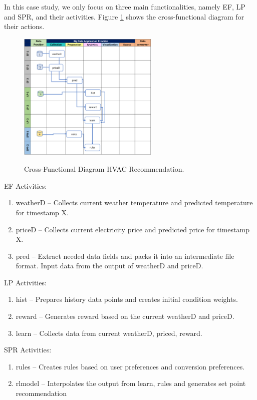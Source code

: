 In this case study, we only focus on three main functionalities, namely EF, LP and SPR, and their
activities. Figure \ref{fig:hvac-2} shows the cross-functional diagram for their actions.



\begin{figure}[htb]
\centering\includegraphics[width=0.6\textwidth]{usecase/hvac-2.png}
\label{fig:hvac-2}
\caption{Cross-Functional Diagram HVAC Recommendation.}
\end{figure}


EF Activities:

\begin{enumerate}
\item weatherD – Collects current weather temperature and predicted temperature for timestamp
X.
\item priceD – Collects current electricity price and predicted price for timestamp X.
\item pred – Extract needed data fields and packs it into an intermediate file format. Input data
from the output of weatherD and priceD.
\end{enumerate}


LP Activities:

\begin{enumerate}
\item hist – Prepares history data points and creates initial condition weights.
\item reward – Generates reward based on the current weatherD and priceD.
\item learn – Collects data from current weatherD, priced, reward.
\end{enumerate}

SPR Activities:

\begin{enumerate}
\item rules – Creates rules based on user preferences and conversion preferences.
\item rlmodel – Interpolates the output from learn, rules and generates set point recommendation
\end{enumerate}



